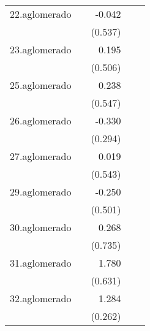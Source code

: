 {\begin{longtable}{l*{4}{D{.}{.}{-1}}}
\addlinespace
22.aglomerado&                     &      -0.042         &                     &                     \\
            &                     &     (0.537)         &                     &                     \\
\addlinespace
23.aglomerado&                     &       0.195         &                     &                     \\
            &                     &     (0.506)         &                     &                     \\
\addlinespace
25.aglomerado&                     &       0.238         &                     &                     \\
            &                     &     (0.547)         &                     &                     \\
\addlinespace
26.aglomerado&                     &      -0.330         &                     &                     \\
            &                     &     (0.294)         &                     &                     \\
\addlinespace
27.aglomerado&                     &       0.019         &                     &                     \\
            &                     &     (0.543)         &                     &                     \\
\addlinespace
29.aglomerado&                     &      -0.250         &                     &                     \\
            &                     &     (0.501)         &                     &                     \\
\addlinespace
30.aglomerado&                     &       0.268         &                     &                     \\
            &                     &     (0.735)         &                     &                     \\
\addlinespace
31.aglomerado&                     &       1.780\sym{**} &                     &                     \\
            &                     &     (0.631)         &                     &                     \\
\addlinespace
32.aglomerado&                     &       1.284\sym{***}&                     &                     \\
            &                     &     (0.262)         &                     &                     \\

\end{longtable}}
